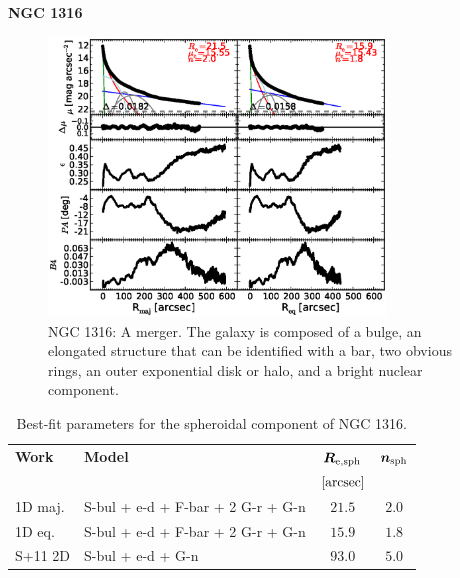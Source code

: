 \documentclass[preprint2]{emulateapj}
\newcommand{\fitfigurewidth}{0.8\textwidth}
\begin{document}
  \clearpage\newpage\noindent
  {\bf NGC 1316 \\}

  \begin{figure}[h]
  \begin{center}
  \includegraphics[width=\fitfigurewidth]{n1316_1Dfit.eps}
  \caption{NGC 1316:  
  A merger. 
  The galaxy is composed of a bulge, an elongated structure that can be identified with a bar, 
  two obvious rings, an outer exponential disk or halo, and a bright nuclear component. }
  \end{center}
  \end{figure}

  \begin{table}[h]
  \small
  \caption{Best-fit parameters for the spheroidal component of NGC 1316.}
  \begin{center}
  \begin{tabular}{llcc}
  \hline
  {\bf Work} & {\bf Model}   & $\bm R_{\rm e,sph}$    & $\bm n_{\rm sph}$ \\
    &  &  $[\rm arcsec]$ & \\
  \hline
  1D maj. & S-bul + e-d + F-bar + 2 G-r + G-n & $21.5$  &  $2.0$ \\
  1D eq.  & S-bul + e-d + F-bar + 2 G-r + G-n & $15.9$  &  $1.8$ \\
  \hline
  S+11 2D      & S-bul + e-d + G-n & $93.0$  &  $5.0$ \\
  \hline
  \end{tabular}
  \end{center}
  \label{tab:n1316}
  \end{table}
\end{document}
